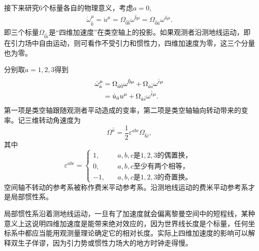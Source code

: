 \documentclass[11pt, a4paper, oneside, onecolumn]{ctexart}
\numberwithin{equation}{subsection}
\begin{document}
接下来研究6个标量各自的物理意义，考虑$a=0$,
\begin{align}
\dot{\omega}^{\mu}_{\hat{0}}=\dot{u}^{\mu}=\Omega_{\hat{0}\hat{b}}\omega^{\hat{b}\mu}=\Omega_{\hat{0}\hat{a}}\omega^{\hat{a}\mu}.
\end{align}
即三个标量$\Omega_{\hat{0}\hat{i}}$是“四维加速度”在类空轴上的投影。如果观测者沿测地线运动，即在引力场中自由运动，则可看作不受引力和惯性力，四维加速度为零，这三个分量也为零。

分别取$a=1,2,3$得到
\begin{align}
\dot{\omega}^{\mu}_{\hat{a}}&=\Omega_{\hat{a}\hat{0}}\omega^{\hat{0}\mu}+\Omega_{\hat{a}\hat{i}}\omega^{\hat{i}\mu}\notag\\
&=\dot{u}_{\hat{a}}u^{\mu}+\Omega_{\hat{a}\hat{i}}\omega^{\hat{i}\mu}.
\end{align}
第一项是类空轴跟随观测者平动造成的变率，第二项是类空轴轴向转动带来的变率。记三维转动角速度为
\begin{equation}
\Omega^{\hat{a}}=\frac{1}{2}\varepsilon^{abc}\Omega_{\hat{b}\hat{c}},
\end{equation}
其中
\begin{equation}
\varepsilon^{abc}=
\begin{cases}
1,&\quad a,b,c\text{是}1,2,3\text{的偶置换，}\\
0,&\quad a,b,c\text{至少有两个相等，}\\
-1,&\quad a,b,c\text{是}1,2,3\text{的奇置换。}
\end{cases}
\end{equation}
空间轴不转动的参考系被称作费米平动参考系。沿测地线运动的费米平动参考系才是局部惯性系。

局部惯性系沿着测地线运动，一旦有了加速度就会偏离黎曼空间中的短程线，某种意义上这说明四维加速度是能带来绝对效应的，因为世界线长度是个标量，任何坐标系中都应当能用观测量理论确定它的相对长度。实际上四维加速度的影响可以解释双生子佯谬，因为引力势或惯性力场大的地方时钟走得慢。
\end{document}
